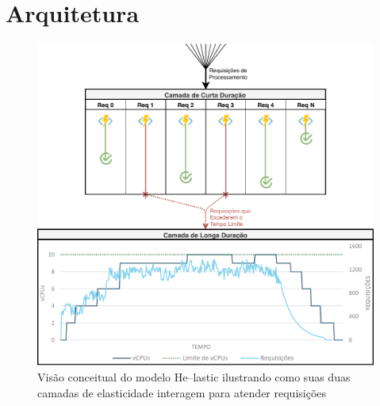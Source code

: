\documentclass[english,brazilian]{UNISINOSmonografia} %
\newcommand\defaultFigureWidth{0.9}
\begin{document}
\section{Arquitetura}
\label{sec:modelo-arquitetura}


\begin{figure}[tb]
	\centering%
	\begin{minipage}{\defaultFigureWidth\textwidth}
		\caption{Visão conceitual do modelo \textsf{He}--lastic ilustrando como suas duas camadas de elasticidade interagem para atender requisições}
		\label{fig:modelo-conceitual}
		\includegraphics[width=\textwidth]{modelo-conceitual}
	\end{minipage}
\end{figure}
\end{document}
